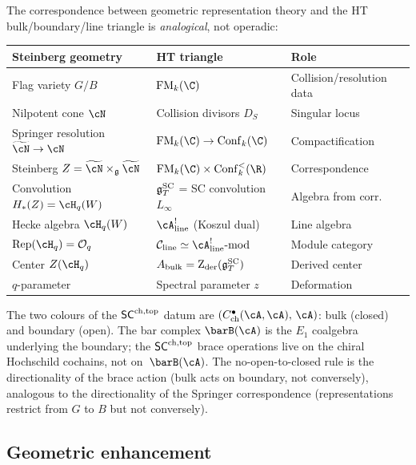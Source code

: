 \begin{remark}
\label{rem:steinberg-dictionary}
The correspondence between geometric representation theory
and the HT bulk/boundary/line triangle is \emph{analogical},
not operadic:
\begin{center}
\renewcommand{\arraystretch}{1.3}
\begin{tabular}{lll}
\hline
\textbf{Steinberg geometry} & \textbf{HT triangle} & \textbf{Role} \\
\hline
Flag variety $G/B$ & $\FM_k(\C)$ & Collision/resolution data \\
Nilpotent cone $\cN$ & Collision divisors $D_S$ & Singular locus \\
Springer resolution $\widetilde\cN \to \cN$
 & $\FM_k(\C) \to \Conf_k(\C)$ & Compactification \\
Steinberg $Z = \widetilde\cN \times_{\mathfrak g} \widetilde\cN$
 & $\FM_k(\C) \times \Conf_k^{<}(\R)$ & Correspondence \\
Convolution $H_*(Z) = \cH_q(W)$
 & $\mathfrak{g}^{\mathrm{SC}}_T$ = SC convolution $L_\infty$ & Algebra from corr. \\
Hecke algebra $\cH_q(W)$
 & $\cA^!_{\mathrm{line}}$ (Koszul dual) & Line algebra \\
$\mathrm{Rep}(\cH_q) = \cO_q$
 & $\cC_{\mathrm{line}} \simeq \cA^!_{\mathrm{line}}\text{-mod}$ & Module category \\
Center $Z(\cH_q)$
 & $A_{\mathrm{bulk}} = \operatorname{Z}_{\mathrm{der}}(\mathfrak{g}^{\mathrm{SC}}_T)$ & Derived center \\
$q$-parameter
 & Spectral parameter $z$ & Deformation \\
\hline
\end{tabular}
\end{center}
The two colours of the $\mathsf{SC}^{\mathrm{ch,top}}$ datum are
$(C^\bullet_{\mathrm{ch}}(\cA,\cA),\,\cA)$: bulk (closed) and
boundary (open). The bar complex $\barB(\cA)$ is the $E_1$
coalgebra underlying the boundary; the $\mathsf{SC}^{\mathrm{ch,top}}$ brace operations
live on the chiral Hochschild cochains, not on~$\barB(\cA)$.
The no-open-to-closed rule
is the directionality of the brace action (bulk acts on boundary,
not conversely), analogous to the directionality of the Springer
correspondence (representations restrict from $G$ to $B$ but
not conversely).
\end{remark}

\subsection{Geometric enhancement}

